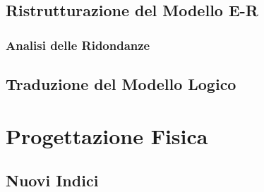 \documentclass{article}
\begin{document}
\subsection{Ristrutturazione del Modello E-R}
\subsubsection{Analisi delle Ridondanze}
\subsection{Traduzione del Modello Logico}


% 
% 
% 
% 
% 
% 




\clearpage
\section{Progettazione Fisica}
\subsection{Nuovi Indici}
\end{document}
